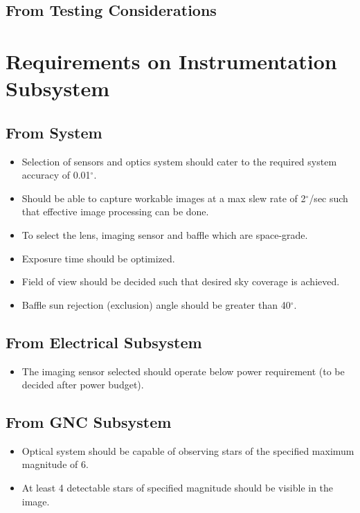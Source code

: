 \documentclass[../../main.tex]{subfiles}
\begin{document}
\subsection {From Testing Considerations} 


\newpage
\section{Requirements on Instrumentation Subsystem}
\subsection{From System}
\begin{itemize}
    \item Selection of sensors and optics system should cater to the required system accuracy of 0.01$^{\circ}$.
    \item Should be able to capture workable images at a max slew rate of 2$^{\circ}$/sec such that effective image processing can be done.
    \item To select the lens, imaging sensor and baffle which are space-grade.
    \item Exposure time should be optimized.
    \item Field of view should be decided such that desired sky coverage is achieved.
    \item Baffle sun rejection (exclusion) angle should be greater than 40$^{\circ}$.
\end{itemize}
\subsection{From Electrical Subsystem}
\begin{itemize}
    \item The imaging sensor selected should operate below power requirement (to be decided after power budget).
    
\end{itemize}
\subsection{From GNC Subsystem}
\begin{itemize}
    \item Optical system should be capable of observing stars of the specified maximum magnitude of 6.
    \item At least 4 detectable stars of specified magnitude should be visible in the image.
\end{itemize}
\end{document}
